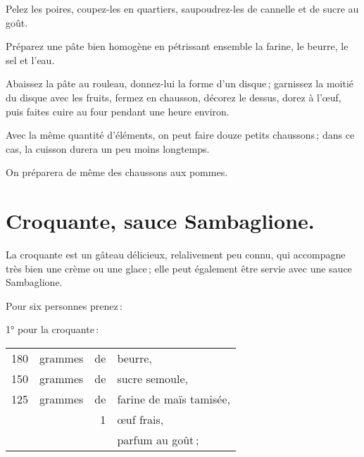 Pelez les poires, coupez-les en quartiers, saupoudrez-les de cannelle et de
sucre au goût.

Préparez une pâte bien homogène en pétrissant ensemble la farine, le beurre,
le sel et l'eau.

Abaissez la pâte au rouleau, donnez-lui la forme d'un disque ; garnissez la
moitié du disque avec les fruits, fermez en chausson, décorez le dessus, dorez
à l'œuf, puis faites cuire au four pendant une heure environ.

Avec la même quantité d'éléments, on peut faire douze petits chaussons ; dans
ce cas, la cuisson durera un peu moins longtemps.

\sk

On préparera de même des chaussons aux pommes.

\section*{\centering Croquante, sauce Sambaglione.}
{}

La croquante est un gâteau délicieux, relalivement peu connu, qui accompagne
très bien une crème ou une glace ; elle peut également être servie avec une
sauce Sambaglione.

\medskip

Pour six personnes prenez :

\medskip

1° pour la croquante :

\footnotesize
\begin{longtable}{rrrp{16em}}
    180 & grammes & de & beurre,                                                                          \\
    150 & grammes & de & sucre semoule,                                                                   \\
    125 & grammes & de & farine de maïs tamisée,                                                          \\
        &         &  1 & œuf frais,                                                                       \\
        &         &    & parfum au goût ;                                                                 \\
\end{longtable}
\normalsize

